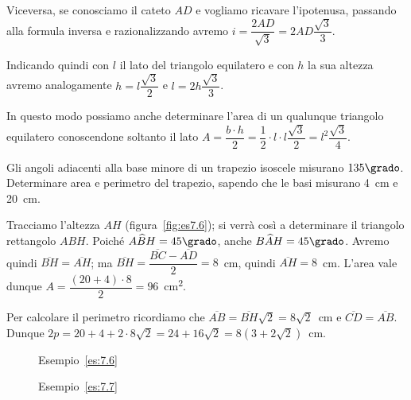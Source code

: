 Viceversa, se conosciamo il cateto \(AD\) e vogliamo ricavare 
l'ipotenusa, passando alla formula inversa e razionalizzando avremo 
\(i=\dfrac{2AD}{\sqrt{3}}=2AD\dfrac{\sqrt{3}}{3}\).

Indicando quindi con \(l\) il lato del triangolo equilatero e con \(h\) 
la sua altezza avremo analogamente \(h=l\dfrac{\sqrt{3}}{2}\) e 
\(l=2h\dfrac{\sqrt{3}}{3}\).

In questo modo possiamo anche determinare l'area di un qualunque 
triangolo equilatero conoscendone soltanto il lato \(A=\dfrac{b\cdot 
h}{2}=\dfrac{1}{2}\cdot l\cdot 
l\dfrac{\sqrt{3}}{2}=l^2\dfrac{\sqrt{3}}{4}\).

\begin{esempio}\label{es:7.6}
Gli angoli adiacenti alla base minore di un trapezio isoscele 
misurano \(135\grado\). Determinare area e perimetro del trapezio, 
sapendo che le basi misurano 4~cm e 20~cm.\vspace{7pt}

Tracciamo l'altezza \(AH\) (figura~\ref{fig:es7.6}); si verrà così a 
determinare il triangolo rettangolo \(ABH\). Poiché 
\(A\widehat{B}H=45\grado\), anche \(B\widehat{A}H=45\grado\). Avremo 
quindi \(\overline{BH}=\overline{AH}\); ma 
\(\overline{BH}=\dfrac{\overline{BC}-\overline{AD}}{2}=8\)~cm, quindi 
\(\overline{AH}=8\)~cm. L'area vale dunque \(A=\dfrac{(20+4)\cdot 
8}{2}=96\)~cm\textsuperscript{2}.

Per calcolare il perimetro ricordiamo che 
\(\overline{AB}=\overline{BH}\sqrt{2}=8\sqrt{2}\)~cm e 
\(\overline{CD}=\overline{AB}\).
Dunque \(2p=20+4+2\cdot 8\sqrt{2}=24+16\sqrt{2}=8(3+2\sqrt{2})\)~cm.
\end{esempio}

\vspace{-2em}

\begin{inaccessibleblock}
 \begin{figure}[!htb]
  \begin{center}
    \begin{minipage}{0.45\textwidth}
      \centering
      
      
\caption{Esempio~\ref{es:7.6}}\label{fig:es7.6}
    \end{minipage}
    \hspace{0.03\textwidth}  
    \begin{minipage}{0.45\textwidth}
      \centering
      
      
\caption{Esempio~\ref{es:7.7}}\label{fig:es7.7}
    \end{minipage}
  \end{center}
\end{figure}
\end{inaccessibleblock}

